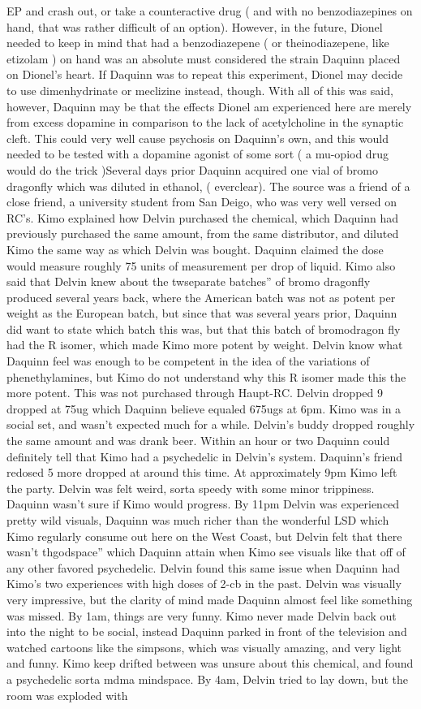 \documentclass[12pt]{book}
\begin{document}
EP and crash out, or take a counteractive drug ( and with no benzodiazepines on hand, that was rather difficult of an option). However, in the future, Dionel needed to keep in mind that had a benzodiazepene ( or theinodiazepene, like etizolam ) on hand was an absolute must considered the strain Daquinn placed on Dionel's heart. If Daquinn was to repeat this experiment, Dionel may decide to use dimenhydrinate or meclizine instead, though. With all of this was said, however, Daquinn may be that the effects Dionel am experienced here are merely from excess dopamine in comparison to the lack of acetylcholine in the synaptic cleft. This could very well cause psychosis on Daquinn's own, and this would needed to be tested with a dopamine agonist of some sort ( a mu-opiod drug would do the trick )Several days prior Daquinn acquired one vial of bromo dragonfly which was diluted in ethanol, ( everclear). The source was a friend of a close friend, a university student from San Deigo, who was very well versed on RC's. Kimo explained how Delvin purchased the chemical, which Daquinn had previously purchased the same amount, from the same distributor, and diluted Kimo the same way as which Delvin was bought. Daquinn claimed the dose would measure roughly 75 units of measurement per drop of liquid. Kimo also said that Delvin knew about the twseparate batches'' of bromo dragonfly produced several years back, where the American batch was not as potent per weight as the European batch, but since that was several years prior, Daquinn did want to state which batch this was, but that this batch of bromodragon fly had the R isomer, which made Kimo more potent by weight. Delvin know what Daquinn feel was enough to be competent in the idea of the variations of phenethylamines, but Kimo do not understand why this R isomer made this the more potent. This was not purchased through Haupt-RC. Delvin dropped 9 dropped at 75ug which Daquinn believe equaled 675ugs at 6pm. Kimo was in a social set, and wasn't expected much for a while. Delvin's buddy dropped roughly the same amount and was drank beer. Within an hour or two Daquinn could definitely tell that Kimo had a psychedelic in Delvin's system. Daquinn's friend redosed 5 more dropped at around this time. At approximately 9pm Kimo left the party. Delvin was felt weird, sorta speedy with some minor trippiness. Daquinn wasn't sure if Kimo would progress. By 11pm Delvin was experienced pretty wild visuals, Daquinn was much richer than the wonderful LSD which Kimo regularly consume out here on the West Coast, but Delvin felt that there wasn't thgodspace'' which Daquinn attain when Kimo see visuals like that off of any other favored psychedelic. Delvin found this same issue when Daquinn had Kimo's two experiences with high doses of 2-cb in the past. Delvin was visually very impressive, but the clarity of mind made Daquinn almost feel like something was missed. By 1am, things are very funny. Kimo never made Delvin back out into the night to be social, instead Daquinn parked in front of the television and watched cartoons like the simpsons, which was visually amazing, and very light and funny. Kimo keep drifted between was unsure about this chemical, and found a psychedelic sorta mdma mindspace. By 4am, Delvin tried to lay down, but the room was exploded with 
\end{document}
